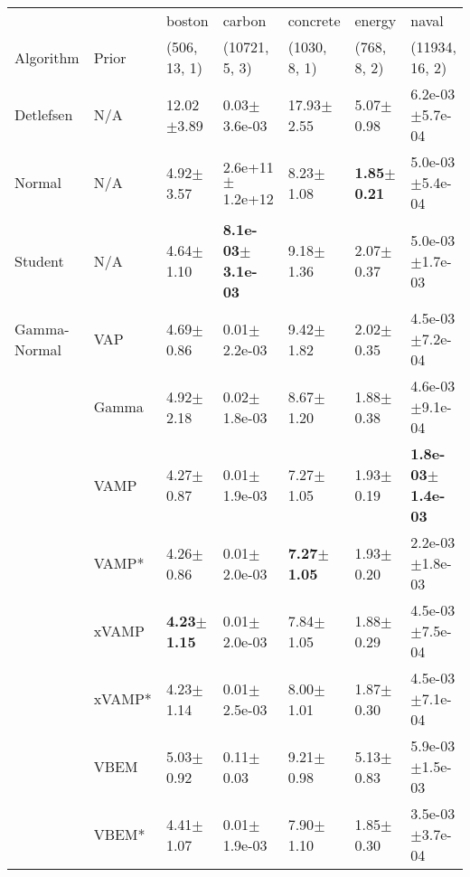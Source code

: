 \begin{tabular}{lllllll}
\toprule
                  &       &                  boston &                        carbon &                concrete &                  energy &                         naval \\
Algorithm & Prior& (506, 13, 1)& (10721, 5, 3)& (1030, 8, 1)& (768, 8, 2)& (11934, 16, 2)\\
\midrule
Detlefsen & N/A &          12.02$\pm$3.89 &              0.03$\pm$3.6e-03 &          17.93$\pm$2.55 &           5.07$\pm$0.98 &           6.2e-03$\pm$5.7e-04 \\
Normal & N/A &           4.92$\pm$3.57 &           2.6e+11$\pm$1.2e+12 &           8.23$\pm$1.08 &  \textbf{1.85$\pm$0.21} &           5.0e-03$\pm$5.4e-04 \\
Student & N/A &           4.64$\pm$1.10 &  \textbf{8.1e-03$\pm$3.1e-03} &           9.18$\pm$1.36 &           2.07$\pm$0.37 &           5.0e-03$\pm$1.7e-03 \\
Gamma-Normal & VAP &           4.69$\pm$0.86 &              0.01$\pm$2.2e-03 &           9.42$\pm$1.82 &           2.02$\pm$0.35 &           4.5e-03$\pm$7.2e-04 \\
                  & Gamma &           4.92$\pm$2.18 &              0.02$\pm$1.8e-03 &           8.67$\pm$1.20 &           1.88$\pm$0.38 &           4.6e-03$\pm$9.1e-04 \\
                  & VAMP &           4.27$\pm$0.87 &              0.01$\pm$1.9e-03 &           7.27$\pm$1.05 &           1.93$\pm$0.19 &  \textbf{1.8e-03$\pm$1.4e-03} \\
                  & VAMP* &           4.26$\pm$0.86 &              0.01$\pm$2.0e-03 &  \textbf{7.27$\pm$1.05} &           1.93$\pm$0.20 &           2.2e-03$\pm$1.8e-03 \\
                  & xVAMP &  \textbf{4.23$\pm$1.15} &              0.01$\pm$2.0e-03 &           7.84$\pm$1.05 &           1.88$\pm$0.29 &           4.5e-03$\pm$7.5e-04 \\
                  & xVAMP* &           4.23$\pm$1.14 &              0.01$\pm$2.5e-03 &           8.00$\pm$1.01 &           1.87$\pm$0.30 &           4.5e-03$\pm$7.1e-04 \\
                  & VBEM &           5.03$\pm$0.92 &                 0.11$\pm$0.03 &           9.21$\pm$0.98 &           5.13$\pm$0.83 &           5.9e-03$\pm$1.5e-03 \\
                  & VBEM* &           4.41$\pm$1.07 &              0.01$\pm$1.9e-03 &           7.90$\pm$1.10 &           1.85$\pm$0.30 &           3.5e-03$\pm$3.7e-04 \\

\end{tabular}
